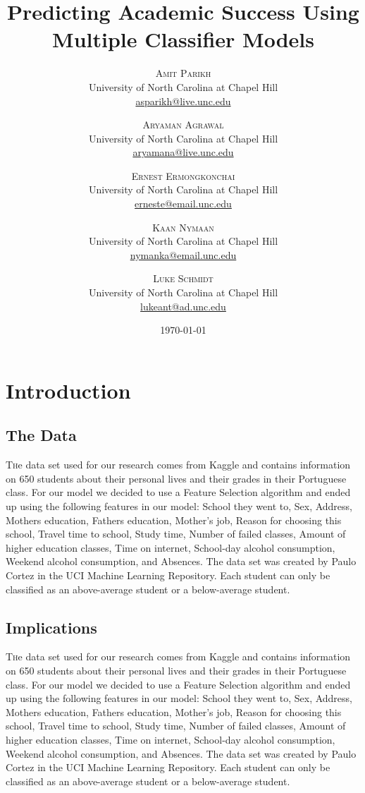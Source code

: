 \documentclass[twoside,twocolumn]{article}
\title{Predicting Academic Success Using Multiple Classifier Models} %
\author{%
\textsc{Amit Parikh} \\[1ex] %
\normalsize University of North Carolina at Chapel Hill \\ %
\normalsize \href{mailto:john@smith.com}{asparikh@live.unc.edu} %
\and %
\textsc{Aryaman Agrawal} \\[1ex] %
\normalsize University of North Carolina at Chapel Hill \\ %
\normalsize \href{mailto:john@smith.com}{aryamana@live.unc.edu} %
\and %
\textsc{Ernest Ermongkonchai} \\[1ex] %
\normalsize University of North Carolina at Chapel Hill \\ %
\normalsize \href{mailto:jane@smith.com}{erneste@email.unc.edu} %
\and %
\textsc{Kaan Nymaan} \\[1ex] %
\normalsize University of North Carolina at Chapel Hill \\ %
\normalsize \href{mailto:jane@smith.com}{nymanka@email.unc.edu} %
\and %
\textsc{Luke Schmidt} \\[1ex] %
\normalsize University of North Carolina at Chapel Hill \\ %
\normalsize \href{mailto:jane@smith.com}{lukeant@ad.unc.edu} %
}
\date{\today} %
\begin{document}
\maketitle


\section{Introduction}
\subsection{The Data}
\lettrine[nindent=0em,lines=3] {T}he data set used for our research comes from Kaggle and contains information on 650 students about their personal lives and their grades in their Portuguese class. For our model we decided to use a Feature Selection algorithm and ended up using the following features in our model: School they went to, Sex, Address, Mothers education, Fathers education, Mother’s job, Reason for choosing this school, Travel time to school, Study time, Number of failed classes, Amount of higher education classes, Time on internet, School-day alcohol consumption, Weekend alcohol consumption, and Absences. The data set was created by Paulo Cortez in the UCI Machine Learning Repository. Each student can only be classified as an above-average student or a below-average student.

\subsection{Implications}
\lettrine[nindent=0em,lines=3] The data set used for our research comes from Kaggle and contains information on 650 students about their personal lives and their grades in their Portuguese class. For our model we decided to use a Feature Selection algorithm and ended up using the following features in our model: School they went to, Sex, Address, Mothers education, Fathers education, Mother’s job, Reason for choosing this school, Travel time to school, Study time, Number of failed classes, Amount of higher education classes, Time on internet, School-day alcohol consumption, Weekend alcohol consumption, and Absences. The data set was created by Paulo Cortez in the UCI Machine Learning Repository. Each student can only be classified as an above-average student or a below-average student.
\end{document}
